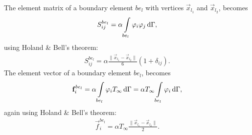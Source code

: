 The element matrix of a boundary element $be_l$ with vertices $\vec{x}_{l_1}$ and $\vec{x}_{l_2}$, becomes
\begin{gather*}
    S_{ij}^{be_l} = \alpha \int\displaylimits_{be_l}\varphi_i \varphi_j \,\mathrm{d}\Gamma,
\end{gather*} using Holand \& Bell's theorem:
\begin{gather}
    S_{ij}^{be_l} = \alpha \frac{\lVert \vec{x}_{l_1} - \vec{x}_{l_2} \rVert}{6} \left( 1 + \delta_{ij} \right).
\end{gather}
The element vector of a boundary element $be_l$, becomes
\begin{gather*}
    \vec{f}_i^{be_l} = \alpha \int\displaylimits_{be_l}\varphi_i T_{\infty} \,\mathrm{d}\Gamma = \alpha T_{\infty} \int\displaylimits_{be_l}\varphi_i \,\mathrm{d}\Gamma,
\end{gather*} again using Holand \& Bell's theorem:
\begin{gather}
    \vec{f}_i^{be_l} = \alpha T_{\infty} \frac{\lVert \vec{x}_{l_1} - \vec{x}_{l_2} \rVert}{2}.
    \label{eq:boundary_vector}
\end{gather}